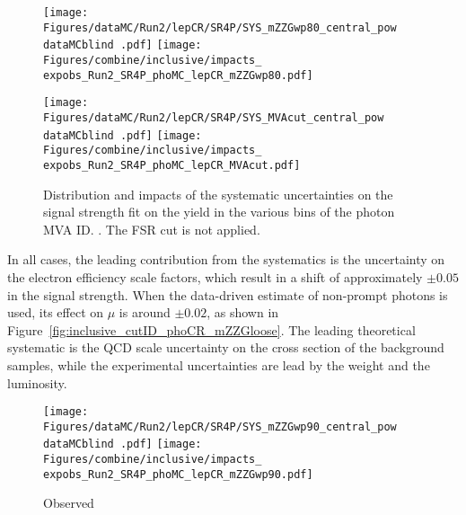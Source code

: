 \begin{figure}
  \centering
  \texttt{[image: Figures/dataMC/Run2/lepCR/SR4P/SYS\_mZZGwp80\_central\_pow\\dataMCblind .pdf]}
  \hfill
  \texttt{[image: Figures/combine/inclusive/impacts\_\\expobs\_Run2\_SR4P\_phoMC\_lepCR\_mZZGwp80.pdf]}
  \caption{}
  \label{fig:inclusive_mvaID_phoMC_mZZGwp80}
\end{figure}

\begin{figure}
  \centering
  \texttt{[image: Figures/dataMC/Run2/lepCR/SR4P/SYS\_MVAcut\_central\_pow\\dataMCblind .pdf]}
  \hfill
  \texttt{[image: Figures/combine/inclusive/impacts\_\\expobs\_Run2\_SR4P\_phoMC\_lepCR\_MVAcut.pdf]}
  \caption{Distribution and impacts of the systematic uncertainties on the signal strength fit
    on the yield in the various bins of the photon MVA ID.
    .
    The FSR cut is not applied.
  }
  \label{fig:inclusive_kin_phoMC_MVAcut}
\end{figure}

In all cases, the leading contribution from the systematics is the uncertainty on the electron efficiency scale factors,
which result in a shift of approximately $\pm 0.05$ in the signal strength.
When the data-driven estimate of non-prompt photons is used, its effect on $\mu$ is around $\pm 0.02$,
as shown in Figure~\ref{fig:inclusive_cutID_phoCR_mZZGloose}.
The leading theoretical systematic is the QCD scale uncertainty on the cross section of the background samples,
while the experimental uncertainties are lead by the \pileup{} weight and the luminosity.

\begin{figure}
  \renewcommand{\dataMCblind}{}
  \renewcommand{\expobs}{observed}
  \centering
  \texttt{[image: Figures/dataMC/Run2/lepCR/SR4P/SYS\_mZZGwp90\_central\_pow\\dataMCblind .pdf]}
  \hfill
  \texttt{[image: Figures/combine/inclusive/impacts\_\\expobs\_Run2\_SR4P\_phoMC\_lepCR\_mZZGwp90.pdf]}
  \caption{Observed }
  \label{fig:impacts_observed_inclusive_Run2_SR4P}
\end{figure}
